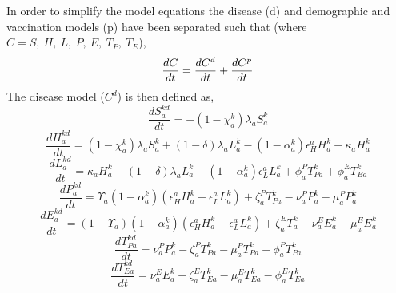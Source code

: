 \documentclass[11pt,twoside]{bristolthesis}
\begin{document}
  In order to simplify the model equations the disease (d) and demographic and vaccination models (p) have been separated such that (where \(C = S,\ H,\ L,\ P,\ E,\ T_P,\ T_E\)),
  \begin{equation}
  \frac{dC}{dt} =  \frac{dC^{d}}{dt} + \frac{dC^{p}}{dt} \\
    \label{eq:split-models}
  \end{equation}
  The disease model (\(C^d\)) is then defined as,
  \begin{equation}
  \frac{dS^{kd}_{a}}{dt} = - (1 - \chi^k_a)\lambda_a S^k_a 
    \label{eq:sus-model}
  \end{equation}
  \begin{equation}
  \frac{dH^{kd}_{a}}{dt} = (1 - \chi^k_a)\lambda_a S^k_a + (1 - \delta)\lambda_a L^k_{a} - (1 - \alpha^k_a)\epsilon^a_H H^{k}_{a} - \kappa_a H^{k}_{a}
    \label{eq:high-model}
  \end{equation}
  \begin{equation}
  \frac{dL^{kd}_{a}}{dt} =  \kappa_a H^{k}_{a} - (1 - \delta)\lambda_a L^k_{a} - (1 - \alpha^k_a) \epsilon^a_L L^{k}_{a} + \phi_a^P T^{k}_{Pa} + \phi_a^E T^{k}_{Ea}
    \label{eq:low-model}
  \end{equation}
  \begin{equation}
  \frac{dP^{kd}_a}{dt} =  \Upsilon_a(1 - \alpha^k_a)(\epsilon^a_HH^{k}_{a}  + \epsilon^a_LL^{k}_{a}) + \zeta^P_a T^{k}_{Pa} - \nu_a^P P^{k}_a - \mu^P_a P^{k}_a
    \label{eq:pul-model}
  \end{equation}
  \begin{equation}
  \frac{dE^{kd}_a}{dt} =  (1 - \Upsilon_a)(1 - \alpha^k_a)(\epsilon^a_HH^{k}_{a}  + \epsilon^a_LL^{k}_{a}) + \zeta^E_a T^{k}_a - \nu_a^E E^{k}_a - \mu^E_a E^{k}_a
    \label{eq:extra-pul-model}
  \end{equation}
  \begin{equation}
  \frac{dT^{kd}_{Pa}}{dt} = \nu_a^P P^{k}_a - \zeta^P_a T^{k}_{Pa} - \mu^P_a T^{k}_{Pa} - \phi_a^P T^{k}_{Pa}
    \label{eq:pul-treat-model}
  \end{equation}
  \begin{equation}
  \frac{dT^{kd}_{Ea}}{dt} = \nu_a^E E^{k}_a - \zeta^E_a T^{k}_{Ea} - \mu^E_a T^{k}_{Ea} - \phi_a^E T^{k}_{Ea}
    \label{eq:extra-pul-treat-model}
  \end{equation}
\end{document}
